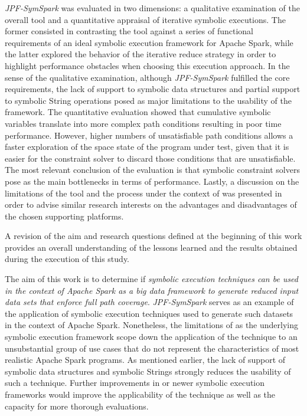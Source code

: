\textit{JPF-SymSpark} was evaluated in two dimensions: a qualitative examination of the overall tool and a quantitative appraisal of iterative symbolic executions. The former consisted in contrasting the tool against a series of functional requirements of an ideal symbolic execution framework for Apache Spark, while the latter explored the behavior of the iterative reduce strategy in order to highlight performance obstacles when choosing this execution approach. In the sense of the qualitative examination, although \textit{JPF-SymSpark} fulfilled the core requirements, the lack of support to symbolic data structures and partial support to symbolic String operations posed as major limitations to the usability of the framework. The quantitative evaluation showed that cumulative symbolic variables translate into more complex path conditions resulting in poor time performance. However, higher numbers of unsatisfiable path conditions allows a faster exploration of the space state of the program under test, given that it is easier for the constraint solver to discard those conditions that are unsatisfiable. The most relevant conclusion of the evaluation is that symbolic constraint solvers pose as the main bottlenecks in terms of performance. Lastly, a discussion on the limitations of the tool and the process under the context of \jpf{} was presented in order to advise similar research interests on the advantages and disadvantages of the chosen supporting platforms.


A revision of the aim and research questions defined at the beginning of this work provides an overall understanding of the lessons learned and the results obtained during the execution of this study.

The aim of this work is to  determine if \textit{symbolic execution techniques can be used in the context of Apache Spark as a big data framework to generate reduced input data sets that enforce full path coverage}. \textit{JPF-SymSpark} serves as an example of the application of symbolic execution techniques used to generate such datasets in the context of Apache Spark. Nonetheless, the limitations of \spf{} as the underlying symbolic execution framework scope down the application of the technique to an unsubstantial group of use cases that do not represent the characteristics of most realistic Apache Spark programs. As mentioned earlier, the lack of support of symbolic data structures and symbolic Strings strongly reduces the usability of such a technique. Further improvements in \spf{} or newer symbolic execution frameworks would improve the applicability of the technique as well as the capacity for more thorough evaluations.


